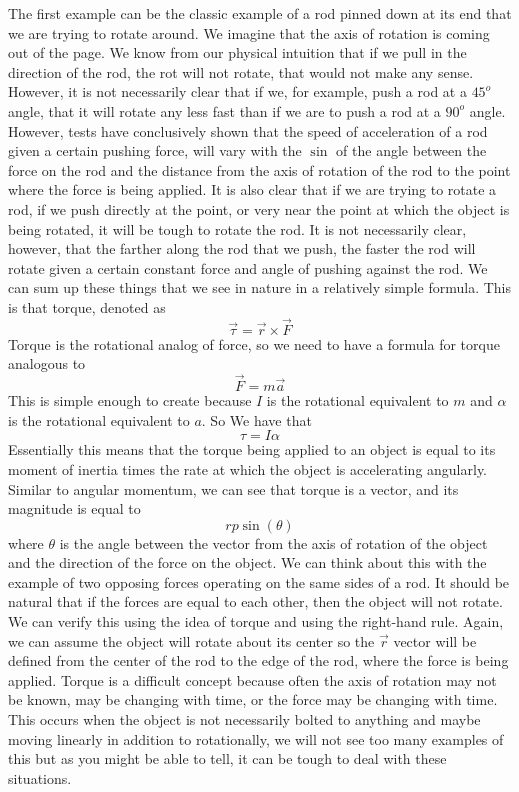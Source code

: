 \documentclass{article}[gray]
\numberwithin{equation}{subsection}
\begin{document}
The first example can be the classic example of a rod pinned down at its end that we are trying to rotate around. We imagine that the axis of rotation is coming out of the page.  We know from our physical intuition that if we pull in the direction of the rod, the rot will not rotate, that would not make any sense. However, it is not necessarily clear that if we, for example, push a rod at a $45^o$ angle, that it will rotate any less fast than if we are to push a rod at a $90^o$ angle. However, tests have conclusively shown that the speed of acceleration of a rod given a certain pushing force, will vary with the $\sin$ of the angle between the force on the rod and the distance from the axis of rotation of the rod to the point where the force is being applied. It is also clear that if we are trying to rotate a rod, if we push directly at the point, or very near the point at which the object is being rotated, it will be tough to rotate the rod. It is not necessarily clear, however, that the farther along the rod that we push, the faster the rod will rotate given a certain constant force and angle of pushing against the rod. We can sum up these things that we see in nature in a relatively simple formula. This is that torque, denoted as \begin{equation}\vec{\tau}= \vec{r} \times \vec{F}\end{equation} Torque is the rotational analog of force, so we need to have a formula for torque analogous to $$\vec{F}=m\vec{a}$$ This is simple enough to create because $I$ is the rotational equivalent to $m$ and $\alpha$ is the rotational equivalent to $a$. So We have that $$\tau=I \alpha$$ Essentially this means that the torque being applied to an object is equal to its moment of inertia times the rate at which the object is accelerating angularly. Similar to angular momentum, we can see that torque is a vector, and its magnitude is equal to $$rp\sin\left(\theta \right)$$ where $\theta$ is the angle between the vector from the axis of rotation of the object and the direction of the force on the object. We can think about this with the example of two opposing forces operating on the same sides of a rod. It should be natural that if the forces are equal to each other, then the object will not rotate. We can verify this using the idea of torque and using the right-hand rule. Again, we can assume the object will rotate about its center so the $\vec{r}$ vector will be defined from the center of the rod to the edge of the rod, where the force is being applied. Torque is a difficult concept because often the axis of rotation may not be known, may be changing with time, or the force may be changing with time. This occurs when the object is not necessarily bolted to anything and maybe moving linearly in addition to rotationally, we will not see too many examples of this but as you might be able to tell, it can be tough to deal with these situations. 
\end{document}
